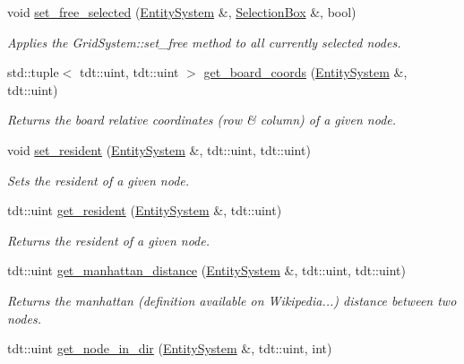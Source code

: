 \begin{DoxyCompactItemize}
void \hyperlink{namespace_grid_node_helper_a4c968313ca4245cf456a5e10faa48e5a}{set\+\_\+free\+\_\+selected} (\hyperlink{class_entity_system}{Entity\+System} \&, \hyperlink{class_selection_box}{Selection\+Box} \&, bool)
\begin{DoxyCompactList}\small\item\em Applies the Grid\+System\+::set\+\_\+free method to all currently selected nodes. \end{DoxyCompactList}\item 
std\+::tuple$<$ tdt\+::uint, tdt\+::uint $>$ \hyperlink{namespace_grid_node_helper_ab1735f470e0a9c2d1ecbf7a37d52ecd3}{get\+\_\+board\+\_\+coords} (\hyperlink{class_entity_system}{Entity\+System} \&, tdt\+::uint)
\begin{DoxyCompactList}\small\item\em Returns the board relative coordinates (row \& column) of a given node. \end{DoxyCompactList}\item 
void \hyperlink{namespace_grid_node_helper_ae89edc87fa9b8ef8aad4ad5eb891c2af}{set\+\_\+resident} (\hyperlink{class_entity_system}{Entity\+System} \&, tdt\+::uint, tdt\+::uint)
\begin{DoxyCompactList}\small\item\em Sets the resident of a given node. \end{DoxyCompactList}\item 
tdt\+::uint \hyperlink{namespace_grid_node_helper_ab29ec60ab1c7c43111d57b1259cb1800}{get\+\_\+resident} (\hyperlink{class_entity_system}{Entity\+System} \&, tdt\+::uint)
\begin{DoxyCompactList}\small\item\em Returns the resident of a given node. \end{DoxyCompactList}\item 
tdt\+::uint \hyperlink{namespace_grid_node_helper_a20ebef55e31ac689a3bbe3eac6c7e6a5}{get\+\_\+manhattan\+\_\+distance} (\hyperlink{class_entity_system}{Entity\+System} \&, tdt\+::uint, tdt\+::uint)
\begin{DoxyCompactList}\small\item\em Returns the manhattan (definition available on Wikipedia...) distance between two nodes. \end{DoxyCompactList}\item 
tdt\+::uint \hyperlink{namespace_grid_node_helper_adba1417813a314b61d43caff26060c93}{get\+\_\+node\+\_\+in\+\_\+dir} (\hyperlink{class_entity_system}{Entity\+System} \&, tdt\+::uint, int)

\end{DoxyCompactItemize}
